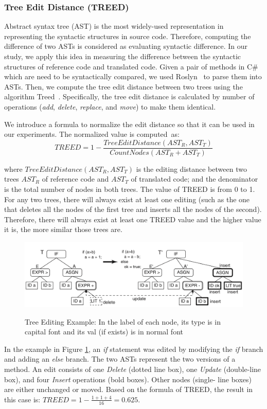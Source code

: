 \subsubsection{\textbf{Tree Edit Distance (TREED)}}  

Abstract syntax tree (AST) is the most widely-used representation in
representing the syntactic structures in source code. Therefore,
computing the difference of two ASTs is considered as evaluating
syntactic difference.  In our study, we apply this idea in measuring
the difference between the syntactic structures of reference code and
translated code. Given a pair of methods in C\# which are need to be
syntactically compared, we used Roslyn~\cite{roslyn} to parse them into
ASTs. Then, we compute the tree edit distance between two trees using
the algorithm Treed~\cite{oopsla10}. Specifically, the tree edit
distance is calculated by number of operations ({\em add}, {\em
delete}, {\em replace}, and {\em move}) to make them identical.

We introduce a formula to normalize the edit distance so that it can
be used in our experiments. The normalized value is computed~as:
\[TREED = 1 -  \frac{TreeEditDistance\left(AST_R, AST_T\right)}{CountNodes \left(AST_R+AST_T\right)}\] 
  
where $TreeEditDistance\left(AST_R, AST_T\right)$ is the editing
distance between two trees $AST_R$ of reference code and $AST_T$ of
translated code; and the denominator is the total number of nodes in
both trees. The value of TREED is from 0 to 1.
%
For any two trees, there will always exist at least one editing (such
as the one that deletes all the nodes of the first tree and inserts all
the nodes of the second). Therefore, there will always exist at least
one TREED value and the higher value it is, the more similar those
trees are.

\begin{figure}[h]
	\caption{Tree Editing Example: In the label of each node, its type is in capital font and its val (if exists) is in normal font}
	\includegraphics[scale=0.3]{img/treed.png}
	\centering
	\label{fig:treed}
\end{figure}

In the example in Figure \ref{fig:treed}, an \textit{if} statement was
edited by modifying the \textit{if} branch and adding an \textit{else}
branch. The two ASTs represent the two versions of a method. An edit
consists of one \textit{Delete} (dotted line box), one \textit{Update}
(double-line box), and four \textit{Insert} operations (bold
boxes). Other nodes (single- line boxes) are either unchanged or
moved. Based on the formula of TREED, the result in this case is:
$TREED = 1 - \frac{1 + 1 + 4}{16}=0.625$.



